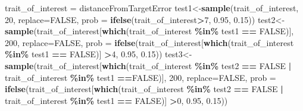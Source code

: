 \documentclass[
]{article}
\newenvironment{Shaded}{\begin{snugshade}}{\end{snugshade}}
\newcommand{\AttributeTok}[1]{\textcolor[rgb]{0.13,0.29,0.53}{#1}}
\newcommand{\ConstantTok}[1]{\textcolor[rgb]{0.56,0.35,0.01}{#1}}
\newcommand{\DecValTok}[1]{\textcolor[rgb]{0.00,0.00,0.81}{#1}}
\newcommand{\FloatTok}[1]{\textcolor[rgb]{0.00,0.00,0.81}{#1}}
\newcommand{\FunctionTok}[1]{\textcolor[rgb]{0.13,0.29,0.53}{\textbf{#1}}}
\newcommand{\NormalTok}[1]{#1}
\newcommand{\OtherTok}[1]{\textcolor[rgb]{0.56,0.35,0.01}{#1}}
\newcommand{\SpecialCharTok}[1]{\textcolor[rgb]{0.81,0.36,0.00}{\textbf{#1}}}
\begin{document}
\begin{Shaded}
\begin{Highlighting}[]
\NormalTok{trait\_of\_interest }\OtherTok{=}\NormalTok{ distanceFromTargetError}
\NormalTok{test1}\OtherTok{\textless{}{-}}\FunctionTok{sample}\NormalTok{(trait\_of\_interest, }\DecValTok{20}\NormalTok{, }\AttributeTok{replace=}\ConstantTok{FALSE}\NormalTok{, }\AttributeTok{prob =} \FunctionTok{ifelse}\NormalTok{(trait\_of\_interest}\SpecialCharTok{\textgreater{}}\DecValTok{7}\NormalTok{, }\FloatTok{0.95}\NormalTok{, }\FloatTok{0.15}\NormalTok{))}
\NormalTok{test2}\OtherTok{\textless{}{-}}\FunctionTok{sample}\NormalTok{(trait\_of\_interest[}\FunctionTok{which}\NormalTok{(trait\_of\_interest }\SpecialCharTok{\%in\%}\NormalTok{ test1 }\SpecialCharTok{==} \ConstantTok{FALSE}\NormalTok{)], }\DecValTok{200}\NormalTok{, }\AttributeTok{replace=}\ConstantTok{FALSE}\NormalTok{, }\AttributeTok{prob =} \FunctionTok{ifelse}\NormalTok{(trait\_of\_interest[}\FunctionTok{which}\NormalTok{(trait\_of\_interest }\SpecialCharTok{\%in\%}\NormalTok{ test1 }\SpecialCharTok{==} \ConstantTok{FALSE}\NormalTok{)] }\SpecialCharTok{\textgreater{}}\DecValTok{4}\NormalTok{, }\FloatTok{0.95}\NormalTok{, }\FloatTok{0.15}\NormalTok{))}
\NormalTok{test3}\OtherTok{\textless{}{-}}\FunctionTok{sample}\NormalTok{(trait\_of\_interest[}\FunctionTok{which}\NormalTok{(trait\_of\_interest }\SpecialCharTok{\%in\%}\NormalTok{ test2 }\SpecialCharTok{==} \ConstantTok{FALSE} \SpecialCharTok{|}\NormalTok{ trait\_of\_interest }\SpecialCharTok{\%in\%}\NormalTok{ test1 }\SpecialCharTok{==}\ConstantTok{FALSE}\NormalTok{)], }\DecValTok{200}\NormalTok{, }\AttributeTok{replace=}\ConstantTok{FALSE}\NormalTok{, }\AttributeTok{prob =} \FunctionTok{ifelse}\NormalTok{(trait\_of\_interest[}\FunctionTok{which}\NormalTok{(trait\_of\_interest }\SpecialCharTok{\%in\%}\NormalTok{ test2 }\SpecialCharTok{==} \ConstantTok{FALSE} \SpecialCharTok{|}\NormalTok{ trait\_of\_interest }\SpecialCharTok{\%in\%}\NormalTok{ test1 }\SpecialCharTok{==} \ConstantTok{FALSE}\NormalTok{)] }\SpecialCharTok{\textgreater{}}\DecValTok{0}\NormalTok{, }\FloatTok{0.95}\NormalTok{, }\FloatTok{0.15}\NormalTok{))}

\end{Highlighting}
\end{Shaded}
\end{document}
